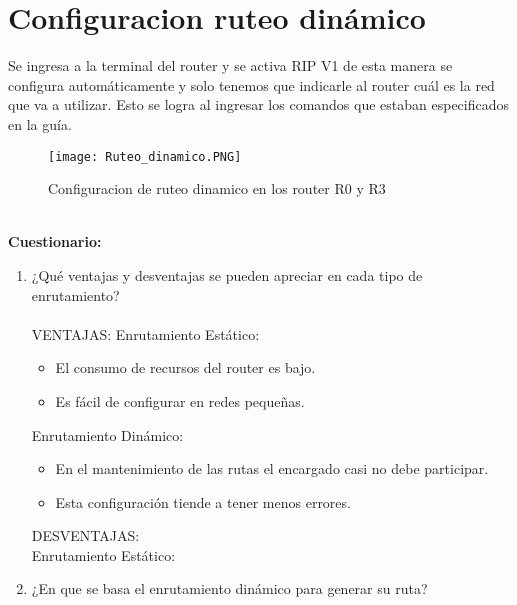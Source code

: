 \documentclass{udpreport}
\begin{document}
	\section{Configuracion ruteo dinámico}
	Se ingresa a la terminal del router y se activa RIP V1 de esta manera se configura automáticamente y solo tenemos que
	indicarle al router cuál es la red que va a utilizar. Esto se logra al ingresar los comandos que estaban especificados en la
	guía.\\
	\begin{figure}[H]
	\centering
	\texttt{[image: Ruteo\_dinamico.PNG]}
	\caption{Configuracion de ruteo dinamico en los router R0 y R3}
	\end{figure}\\
{\large \bf{Cuestionario: }}\\
	\begin{enumerate}
	    \item ¿Qué ventajas y desventajas se pueden apreciar en cada tipo de enrutamiento?\\\\
	    VENTAJAS:
	    Enrutamiento Estático:\\
	    \begin{itemize}
	    	\item El consumo de recursos del router es bajo.
	    	\item Es fácil de configurar en redes pequeñas.
	    \end{itemize}
	    Enrutamiento Dinámico:\\
	    \begin{itemize}
	    	\item En el mantenimiento de las rutas el encargado casi no debe participar.
	    	\item Esta configuración tiende a tener menos errores.
	    \end{itemize}
	    DESVENTAJAS:\\
	    Enrutamiento Estático:\\
            \item ¿En que se basa el enrutamiento dinámico para generar su ruta?\\\\
 
  	     
	\end{enumerate}
	
\end{document}
